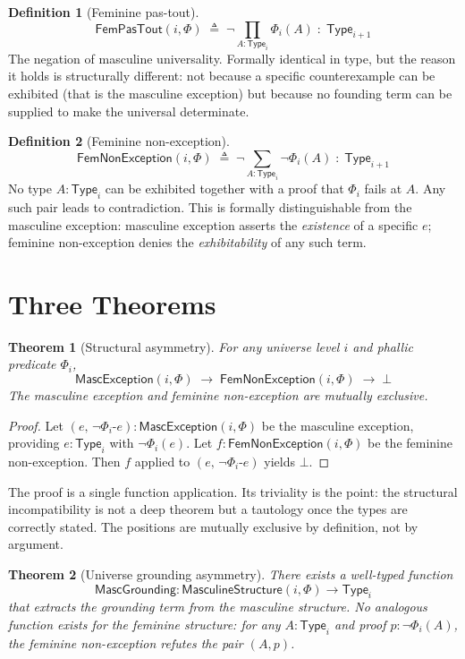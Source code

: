 \documentclass[12pt]{article}
\newtheorem{theorem}{Theorem}
\theoremstyle{definition}
\newtheorem{definition}{Definition}
\theoremstyle{remark}
\newcommand{\Type}[1]{\mathsf{Type}_{#1}}
\newcommand{\MascE}{\mathsf{MascException}}
\newcommand{\FemP}{\mathsf{FemPasTout}}
\newcommand{\FemN}{\mathsf{FemNonException}}
\begin{document}
\begin{definition}[Feminine pas-tout]
\[
\FemP(i, \Phi) \;\triangleq\; \lnot\!\prod_{A:\Type{i}} \Phi_i(A) \;:\; \Type{i+1}
\]
The negation of masculine universality. Formally identical in type, but the reason it holds is structurally different: not because a specific counterexample can be exhibited (that is the masculine exception) but because no founding term can be supplied to make the universal determinate.
\end{definition}

\begin{definition}[Feminine non-exception]
\[
\FemN(i, \Phi) \;\triangleq\; \lnot\!\sum_{A:\Type{i}} \lnot\Phi_i(A) \;:\; \Type{i+1}
\]
No type $A : \Type{i}$ can be exhibited together with a proof that $\Phi_i$ fails at $A$. Any such pair leads to contradiction. This is formally distinguishable from the masculine exception: masculine exception asserts the \emph{existence} of a specific $e$; feminine non-exception denies the \emph{exhibitability} of any such term.
\end{definition}

\section{Three Theorems}

\begin{theorem}[Structural asymmetry]
For any universe level $i$ and phallic predicate $\Phi_i$,
\[
\MascE(i, \Phi) \;\to\; \FemN(i, \Phi) \;\to\; \bot
\]
The masculine exception and feminine non-exception are mutually exclusive.
\end{theorem}

\begin{proof}
Let $(e,\, \lnot\Phi_i\text{-}e) : \MascE(i, \Phi)$ be the masculine exception, providing $e : \Type{i}$ with $\lnot\Phi_i(e)$. Let $f : \FemN(i, \Phi)$ be the feminine non-exception. Then $f$ applied to $(e,\, \lnot\Phi_i\text{-}e)$ yields $\bot$.
\end{proof}

The proof is a single function application. Its triviality is the point: the structural incompatibility is not a deep theorem but a tautology once the types are correctly stated. The positions are mutually exclusive by definition, not by argument.

\begin{theorem}[Universe grounding asymmetry]
There exists a well-typed function
\[
\mathsf{MascGrounding} : \mathsf{MasculineStructure}(i, \Phi) \to \Type{i}
\]
that extracts the grounding term from the masculine structure. No analogous function exists for the feminine structure: for any $A : \Type{i}$ and proof $p : \lnot\Phi_i(A)$, the feminine non-exception refutes the pair $(A, p)$.
\end{theorem}
\end{document}
